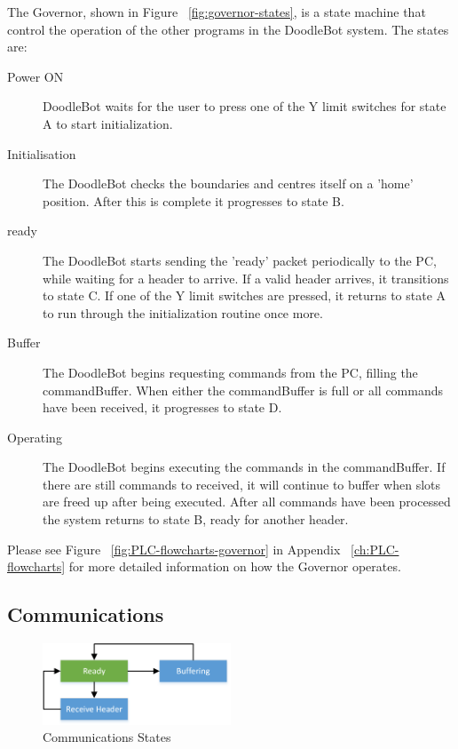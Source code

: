 		The Governor, shown in Figure ~\ref{fig:governor-states}, is a state machine that control the operation of the other programs in the DoodleBot system. The states are:
		
		\begin{description}
			\item[Power ON] DoodleBot waits for the user to press one of the Y limit switches for state A to start initialization.
			\item[Initialisation] The DoodleBot checks the boundaries and centres itself on a 'home' position. After this is complete it progresses to state B.
			\item[ready] The DoodleBot starts sending the 'ready' packet periodically to the PC, while waiting for a header to arrive. If a valid header arrives, it transitions to state C. If one of the Y limit switches are pressed, it returns to state A to run through the initialization routine once more.
			\item[Buffer] The DoodleBot begins requesting commands from the PC, filling the commandBuffer. When either the commandBuffer is full or all commands have been received, it progresses to state D.
			\item[Operating] The DoodleBot begins executing the commands in the commandBuffer. If there are still commands to received, it will continue to buffer when slots are freed up after being executed. After all commands have been processed the system returns to state B, ready for another header.
		\end{description}
		
		Please see Figure ~\ref{fig:PLC-flowcharts-governor} in Appendix ~\ref{ch:PLC-flowcharts} for more detailed information on how the Governor operates.

\subsection{Communications}
	
			\begin{figure}[h]
				\centering
				\includegraphics[width=0.5\textwidth]{figures/cncMachine/communications_simple.png}
				\caption{Communications States}
				\label{fig:comms-states}
			\end{figure}
	
